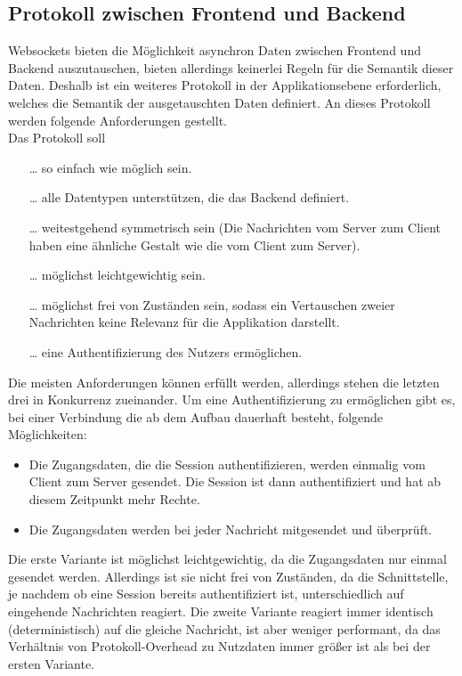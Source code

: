 \subsection{Protokoll zwischen Frontend und Backend}\label{subsec:protokollBackendFrontend}
Websockets bieten die Möglichkeit asynchron Daten zwischen Frontend und Backend auszutauschen, 
bieten allerdings keinerlei Regeln für die Semantik dieser Daten. 
Deshalb ist ein weiteres Protokoll in der Applikationsebene erforderlich, 
welches die Semantik der ausgetauschten Daten definiert. 
An dieses Protokoll werden folgende Anforderungen gestellt.\\
Das Protokoll soll
\begin{itemize}
 \item [\dots]so einfach wie möglich sein.
 \item [\dots]alle Datentypen unterstützen, die das Backend definiert.
 \item [\dots]weitestgehend symmetrisch sein (Die Nachrichten vom Server zum Client haben eine ähnliche Gestalt wie die vom Client zum Server).
 \item [\dots]möglichst leichtgewichtig sein.
 \item [\dots]möglichst frei von Zuständen sein, sodass ein Vertauschen zweier Nachrichten keine Relevanz für die Applikation darstellt.
 \item [\dots]eine Authentifizierung des Nutzers ermöglichen.
\end{itemize}
Die meisten Anforderungen können erfüllt werden, allerdings stehen die letzten drei in Konkurrenz zueinander.
Um eine Authentifizierung zu ermöglichen gibt es, bei einer Verbindung die ab dem Aufbau dauerhaft besteht, folgende Möglichkeiten:
\begin{itemize}
  \item Die Zugangsdaten, die die Session authentifizieren, werden einmalig vom Client zum Server gesendet.
  Die Session ist dann authentifiziert und hat ab diesem Zeitpunkt mehr Rechte.
  \item Die Zugangsdaten werden bei jeder Nachricht mitgesendet und überprüft. 
\end{itemize}
Die erste Variante ist möglichst leichtgewichtig, da die Zugangsdaten nur einmal gesendet werden. 
Allerdings ist sie nicht frei von Zuständen, da die Schnittstelle, je nachdem ob eine Session bereits authentifiziert ist, unterschiedlich auf eingehende Nachrichten reagiert.
Die zweite Variante reagiert immer identisch (deterministisch) auf die gleiche Nachricht, 
ist aber weniger performant, da das Verhältnis von Protokoll-Overhead zu Nutzdaten immer größer ist als bei der ersten Variante.
